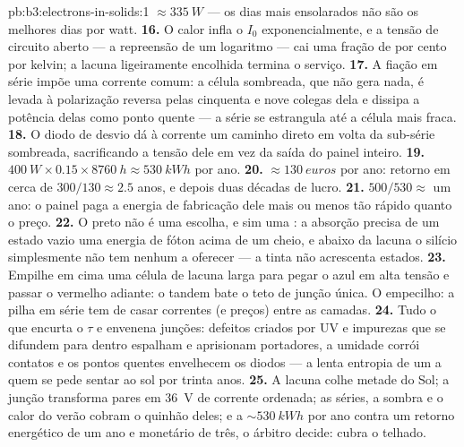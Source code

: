 \begin{solution}{pb:b3:electrons-in-solids:1}
$\approx\qty{335}{W}$ --- os dias mais ensolarados não são os melhores
dias por watt.
\textbf{16.} O calor infla o $I_0$ exponencialmente, e a
tensão de circuito aberto --- a repreensão de um logaritmo --- cai uma
fração de por cento por kelvin; a lacuna ligeiramente encolhida
termina o serviço.
\textbf{17.} A fiação em série impõe uma corrente comum: a célula
sombreada, que não gera nada, é levada à polarização reversa pelas
cinquenta e nove colegas dela e dissipa a potência delas como ponto quente
--- a série se estrangula até a célula mais fraca.
\textbf{18.} O diodo de desvio dá à corrente um caminho direto
em volta da sub-série sombreada, sacrificando a tensão dele em vez da
saída do painel inteiro.
\textbf{19.} $\qty{400}{W}\times0.15\times\qty{8760}{h} \approx
\qty{530}{kWh}$ por ano.
\textbf{20.} $\approx\qty{130}{euros}$ por ano: retorno em
cerca de $300/130 \approx 2.5$ anos, e depois duas décadas de lucro.
\textbf{21.} $500/530 \approx$ um ano: o painel paga a energia de
fabricação dele mais ou menos tão rápido quanto o preço.
\textbf{22.} O preto não é uma escolha, e sim uma :
a absorção precisa de um estado vazio uma energia de fóton acima de um
cheio, e abaixo da lacuna o silício simplesmente não tem nenhum a
oferecer --- a tinta não acrescenta estados.
\textbf{23.} Empilhe em cima uma célula de lacuna larga para pegar o
azul em alta tensão e passar o vermelho adiante: o tandem bate o
teto de junção única. O empecilho: a pilha em série tem de casar
correntes (e preços) entre as camadas.
\textbf{24.} Tudo o que encurta o $\tau$ e envenena junções:
defeitos criados por UV e impurezas que se difundem para dentro espalham
e aprisionam portadores, a umidade corrói contatos e os pontos quentes
envelhecem os diodos --- a lenta entropia de um  a quem se pede
sentar ao sol por trinta anos.
\textbf{25.} A lacuna colhe metade do Sol; a junção transforma
pares em \qty{36}{V} de corrente ordenada; as séries,
a sombra e o calor do verão cobram o quinhão deles; e a
$\sim\qty{530}{kWh}$ por ano contra um retorno energético de um ano e
monetário de três, o árbitro decide: cubra o telhado.
\end{solution}
